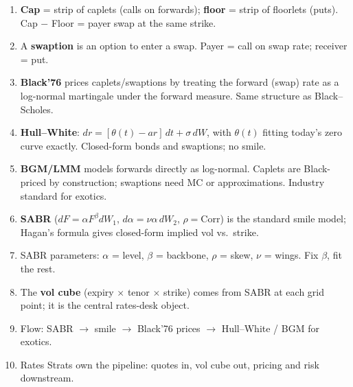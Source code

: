 \begin{keyfactbox}
\begin{enumerate}
  \item \textbf{Cap} = strip of caplets (calls on forwards);
    \textbf{floor} = strip of floorlets (puts).  Cap $-$ Floor = payer
    swap at the same strike.
  \item A \textbf{swaption} is an option to enter a swap.  Payer =
    call on swap rate; receiver = put.
  \item \textbf{Black'76} prices caplets/swaptions by treating the
    forward (swap) rate as a log-normal martingale under the forward
    measure.  Same structure as Black--Scholes.
  \item \textbf{Hull--White}: $dr = [\theta(t) - ar]\,dt + \sigma\,dW$,
    with $\theta(t)$ fitting today's zero curve exactly.  Closed-form
    bonds and swaptions; no smile.
  \item \textbf{BGM/LMM} models forwards directly as log-normal.
    Caplets are Black-priced by construction; swaptions need MC or
    approximations.  Industry standard for exotics.
  \item \textbf{SABR} ($dF = \alpha F^\beta dW_1$, $d\alpha = \nu
    \alpha\,dW_2$, $\rho = \text{Corr}$) is the standard smile model;
    Hagan's formula gives closed-form implied vol vs.\ strike.
  \item SABR parameters: $\alpha$ = level, $\beta$ = backbone, $\rho$
    = skew, $\nu$ = wings.  Fix $\beta$, fit the rest.
  \item The \textbf{vol cube} (expiry $\times$ tenor $\times$ strike)
    comes from SABR at each grid point; it is the central rates-desk
    object.
  \item Flow: SABR $\to$ smile $\to$ Black'76 prices $\to$ Hull--White
    / BGM for exotics.
  \item Rates Strats own the pipeline: quotes in, vol cube out,
    pricing and risk downstream.
\end{enumerate}
\end{keyfactbox}
